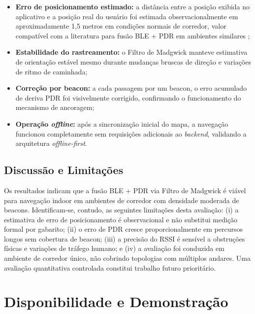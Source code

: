 \documentclass[12pt]{article}
\begin{document}
\begin{itemize}
  \item \textbf{Erro de posicionamento estimado:} a distância entre a posição
        exibida no aplicativo e a posição real do usuário foi estimada
        observacionalmente em aproximadamente 1,5 metros em condições normais
        de corredor, valor compatível com a literatura para fusão BLE + PDR
        em ambientes similares \cite{Faragher2015};
  \item \textbf{Estabilidade do rastreamento:} o Filtro de Madgwick manteve
        estimativa de orientação estável mesmo durante mudanças bruscas de
        direção e variações de ritmo de caminhada;
  \item \textbf{Correção por beacon:} a cada passagem por um beacon, o erro
        acumulado de deriva PDR foi visivelmente corrigido, confirmando o
        funcionamento do mecanismo de ancoragem;
  \item \textbf{Operação \textit{offline}:} após a sincronização inicial do
        mapa, a navegação funcionou completamente sem requisições adicionais
        ao \textit{backend}, validando a arquitetura \textit{offline-first}.
\end{itemize}

\subsection{Discussão e Limitações}

Os resultados indicam que a fusão BLE + PDR via Filtro de Madgwick é viável para
navegação indoor em ambientes de corredor com densidade moderada de beacons.
Identificam-se, contudo, as seguintes limitações desta avaliação: (i) a estimativa
de erro de posicionamento é observacional e não substitui medição formal por gabarito;
(ii) o erro de PDR cresce proporcionalmente em percursos longos sem cobertura de
beacon; (iii) a precisão do RSSI é sensível a obstruções físicas e variações de
tráfego humano; e (iv) a avaliação foi conduzida em ambiente de corredor único,
não cobrindo topologias com múltiplos andares. Uma avaliação quantitativa
controlada constitui trabalho futuro prioritário.

\section{Disponibilidade e Demonstração}
\end{document}
